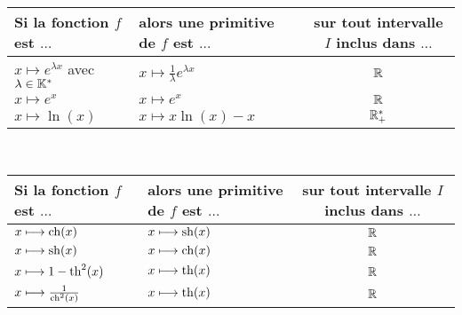 \begin{defprop}
    ~\\
    \renewcommand{\arraystretch}{2.75}
	\begin{tabular}{|l|l|c|}

		\hline
		Si la fonction \(f\) est \(\dots\) & alors une primitive de \(f\) est \(\dots\) & sur tout intervalle \(I\) inclus dans \(\dots\)\\
        \hline
        \(x\mapsto e^{\lambda x}\) avec \(\lambda \in \mathbb{K}^*\) & \(x\mapsto \frac{1}{\lambda} e^{\lambda x}\) & \(\mathbb{R}\) \\
        \(x\mapsto e^x\) & \(x\mapsto e^x\) & \(\mathbb{R}\) \\
        \(x\mapsto \ln(x)\) & \(x\mapsto x\ln(x)-x\) & \(\mathbb{R}_+^*\) \\
        \hline
	\end{tabular}
\end{defprop}
\vspace{10cm} 
\begin{defprop}
    ~\\
    \renewcommand{\arraystretch}{2.75}
	\begin{tabular}{|l|l|c|}

		\hline
		Si la fonction \(f\) est \(\dots\) & alors une primitive de \(f\) est \(\dots\) & sur tout intervalle \(I\) inclus dans \(\dots\)\\
        \hline
        \(x\longmapsto \operatorname{ch}(x)\) & \(x\longmapsto \operatorname{sh}(x) \) & \(\mathbb{R}\) \\
        \(x\longmapsto \operatorname{sh}(x)\) & \(x\longmapsto \operatorname{ch}(x) \) & \(\mathbb{R}\) \\
        \(x\longmapsto 1-\operatorname{th}^2(x)\) & \(x\longmapsto \operatorname{th}(x) \) & \(\mathbb{R}\) \\
        \(x\longmapsto \frac{1}{\operatorname{ch}^2(x)}\) & \(x\longmapsto \operatorname{th}(x) \) & \(\mathbb{R}\) \\        
        \hline
	\end{tabular}
\end{defprop}
